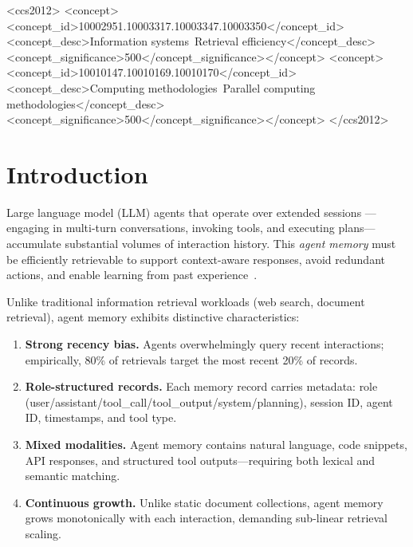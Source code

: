 \documentclass[sigconf,nonacm,anonymous]{acmart}
\begin{document}
\begin{CCSXML}
<ccs2012>
<concept><concept_id>10002951.10003317.10003347.10003350</concept_id>
<concept_desc>Information systems~Retrieval efficiency</concept_desc>
<concept_significance>500</concept_significance></concept>
<concept><concept_id>10010147.10010169.10010170</concept_id>
<concept_desc>Computing methodologies~Parallel computing methodologies</concept_desc>
<concept_significance>500</concept_significance></concept>
</ccs2012>
\end{CCSXML}



\maketitle

\section{Introduction}
\label{sec:intro}

Large language model (LLM) agents that operate over extended sessions
---engaging in multi-turn conversations, invoking tools, and executing
plans---accumulate substantial volumes of interaction history.  This
\emph{agent memory} must be efficiently retrievable to support
context-aware responses, avoid redundant actions, and enable
learning from past experience~\cite{park2023generative,
shinn2023reflexion,sumers2024coala}.

Unlike traditional information retrieval workloads (web search,
document retrieval), agent memory exhibits distinctive characteristics:

\begin{enumerate}
\item \textbf{Strong recency bias.} Agents overwhelmingly query recent
  interactions; empirically, 80\% of retrievals target the most
  recent 20\% of records.
\item \textbf{Role-structured records.} Each memory record carries
  metadata: role (user/assistant/tool\_call/tool\_output/system/planning),
  session ID, agent ID, timestamps, and tool type.
\item \textbf{Mixed modalities.} Agent memory contains natural language,
  code snippets, API responses, and structured tool outputs---requiring
  both lexical and semantic matching.
\item \textbf{Continuous growth.} Unlike static document collections,
  agent memory grows monotonically with each interaction, demanding
  sub-linear retrieval scaling.
\end{enumerate}
\end{document}
